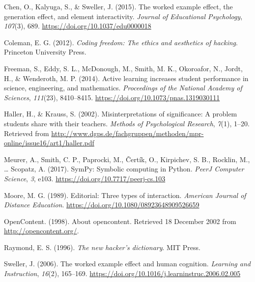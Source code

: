 \documentclass[]{book}
\begin{document}
\hypertarget{ref-chen2015worked}{}
Chen, O., Kalyuga, S., \& Sweller, J. (2015). The worked example effect,
the generation effect, and element interactivity. \emph{Journal of
Educational Psychology}, \emph{107}(3), 689.
\url{https://doi.org/10.1037/edu0000018}

\hypertarget{ref-coleman2012coding}{}
Coleman, E. G. (2012). \emph{Coding freedom: The ethics and aesthetics
of hacking}. Princeton University Press.

\hypertarget{ref-freeman2014active}{}
Freeman, S., Eddy, S. L., McDonough, M., Smith, M. K., Okoroafor, N.,
Jordt, H., \& Wenderoth, M. P. (2014). Active learning increases student
performance in science, engineering, and mathematics. \emph{Proceedings
of the National Academy of Sciences}, \emph{111}(23), 8410--8415.
\url{https://doi.org/10.1073/pnas.1319030111}

\hypertarget{ref-HallerKrauss2002}{}
Haller, H., \& Krauss, S. (2002). Misinterpretations of significance: A
problem students share with their teachers. \emph{Methods of
Psychological Research}, \emph{7}(1), 1--20. Retrieved from
\url{http://www.dgps.de/fachgruppen/methoden/mpr-online/issue16/art1/haller.pdf}

\hypertarget{ref-Meurer2017}{}
Meurer, A., Smith, C. P., Paprocki, M., Čertík, O., Kirpichev, S. B.,
Rocklin, M., \ldots{} Scopatz, A. (2017). SymPy: Symbolic computing in
Python. \emph{PeerJ Computer Science}, \emph{3}, e103.
\url{https://doi.org/10.7717/peerj-cs.103}

\hypertarget{ref-moore1989three}{}
Moore, M. G. (1989). Editorial: Three types of interaction.
\emph{American Journal of Distance Education}.
\url{https://doi.org/10.1080/08923648909526659}

\hypertarget{ref-OC1998}{}
OpenContent. (1998). About opencontent. Retrieved 18 December 2002 from
\url{http://opencontent.org/}.

\hypertarget{ref-raymond1996new}{}
Raymond, E. S. (1996). \emph{The new hacker's dictionary}. MIT Press.

\hypertarget{ref-sweller2006worked}{}
Sweller, J. (2006). The worked example effect and human cognition.
\emph{Learning and Instruction}, \emph{16}(2), 165--169.
\url{https://doi.org/10.1016/j.learninstruc.2006.02.005}
\end{document}
